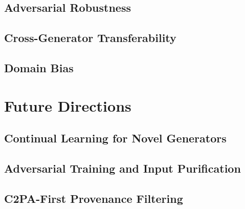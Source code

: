 \documentclass[12pt,a4paper]{book}
\theoremstyle{definition}
\theoremstyle{remark}
\begin{document}
\subsection{Adversarial Robustness}
\subsection{Cross-Generator Transferability}
\subsection{Domain Bias}

\section{Future Directions}\label{sec:future}
\subsection{Continual Learning for Novel Generators}
\subsection{Adversarial Training and Input Purification}
\subsection{C2PA-First Provenance Filtering}
\end{document}
